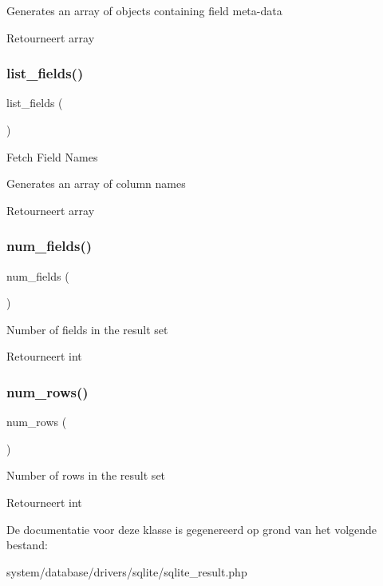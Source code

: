 Generates an array of objects containing field meta-\/data

\begin{DoxyReturn}{Retourneert}
array 
\end{DoxyReturn}
\mbox{\label{class_c_i___d_b__sqlite__result_a50b54eb4ea7cfd039740f532988ea776}} 
\subsubsection{\texorpdfstring{list\_fields()}{list\_fields()}}
{\footnotesize\ttfamily list\+\_\+fields (\begin{DoxyParamCaption}{ }\end{DoxyParamCaption})}

Fetch Field Names

Generates an array of column names

\begin{DoxyReturn}{Retourneert}
array 
\end{DoxyReturn}
\mbox{\label{class_c_i___d_b__sqlite__result_af831bf363e4d7d661a717a4932af449d}} 
\subsubsection{\texorpdfstring{num\_fields()}{num\_fields()}}
{\footnotesize\ttfamily num\+\_\+fields (\begin{DoxyParamCaption}{ }\end{DoxyParamCaption})}

Number of fields in the result set

\begin{DoxyReturn}{Retourneert}
int 
\end{DoxyReturn}
\mbox{\label{class_c_i___d_b__sqlite__result_a218657c303ee499b97710ab0cd2f5d6e}} 
\subsubsection{\texorpdfstring{num\_rows()}{num\_rows()}}
{\footnotesize\ttfamily num\+\_\+rows (\begin{DoxyParamCaption}{ }\end{DoxyParamCaption})}

Number of rows in the result set

\begin{DoxyReturn}{Retourneert}
int 
\end{DoxyReturn}


De documentatie voor deze klasse is gegenereerd op grond van het volgende bestand\+:\begin{DoxyCompactItemize}
\item 
system/database/drivers/sqlite/sqlite\+\_\+result.\+php\end{DoxyCompactItemize}
